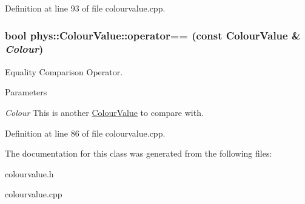 Definition at line 93 of file colourvalue.cpp.

\hypertarget{classphys_1_1ColourValue_a4615835cadb51c814ef87377ac2fbc8c}{
\subsubsection[{operator==}]{\setlength{\rightskip}{0pt plus 5cm}bool phys::ColourValue::operator== (const {\bf ColourValue} \& {\em Colour})}}
\label{d3/db0/classphys_1_1ColourValue_a4615835cadb51c814ef87377ac2fbc8c}


Equality Comparison Operator. 


\begin{DoxyParams}{Parameters}
\item[{\em Colour}]This is another \hyperlink{classphys_1_1ColourValue}{ColourValue} to compare with. \end{DoxyParams}


Definition at line 86 of file colourvalue.cpp.



The documentation for this class was generated from the following files:\begin{DoxyCompactItemize}
\item 
colourvalue.h\item 
colourvalue.cpp\end{DoxyCompactItemize}
